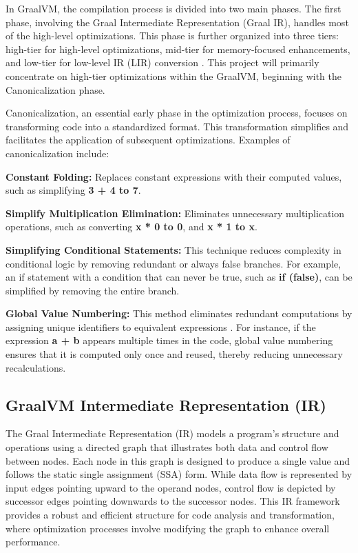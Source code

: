 In GraalVM, the compilation process is divided into two main phases. The first phase, involving the Graal Intermediate Representation (Graal IR), handles most of the high-level optimizations. This phase is further organized into three tiers: high-tier for high-level optimizations, mid-tier for memory-focused enhancements, and low-tier for low-level IR (LIR) conversion \cite{Graal2021}. This project will primarily concentrate on high-tier optimizations within the GraalVM, beginning with the Canonicalization phase.

Canonicalization, an essential early phase in the optimization process, focuses on transforming code into a standardized format. This transformation simplifies and facilitates the application of subsequent optimizations. Examples of canonicalization include:

\begin{compactitem}
    \item \textbf{Constant Folding:} Replaces constant expressions with their computed values, such as simplifying \textbf{3 + 4 to 7}.
    \item \textbf{Simplify Multiplication Elimination:} Eliminates unnecessary multiplication operations, such as converting \textbf{x * 0 to 0}, and \textbf{x * 1 to x}.
    \item \textbf{Simplifying Conditional Statements:} This technique reduces complexity in conditional logic by removing redundant or always false branches. For example, an if statement with a condition that can never be true, such as \textbf{if (false)}, can be simplified by removing the entire branch.
    \item \textbf{Global Value Numbering:} This method eliminates redundant computations by assigning unique identifiers to equivalent expressions \cite{Cliff1995}. For instance, if the expression \textbf{a + b} appears multiple times in the code, global value numbering ensures that it is computed only once and reused, thereby reducing unnecessary recalculations.
\end{compactitem}

\subsection{GraalVM Intermediate Representation (IR)}

The Graal Intermediate Representation (IR) \cite{Duboscq2013} models a program's structure and operations using a directed graph that illustrates both data and control flow between nodes. Each node in this graph is designed to produce a single value and follows the static single assignment (SSA) \cite{Ron1991} form. While data flow is represented by input edges pointing upward to the operand nodes, control flow is depicted by successor edges pointing downwards to the successor nodes. This IR framework provides a robust and efficient structure for code analysis and transformation, where optimization processes involve modifying the graph to enhance overall performance.

